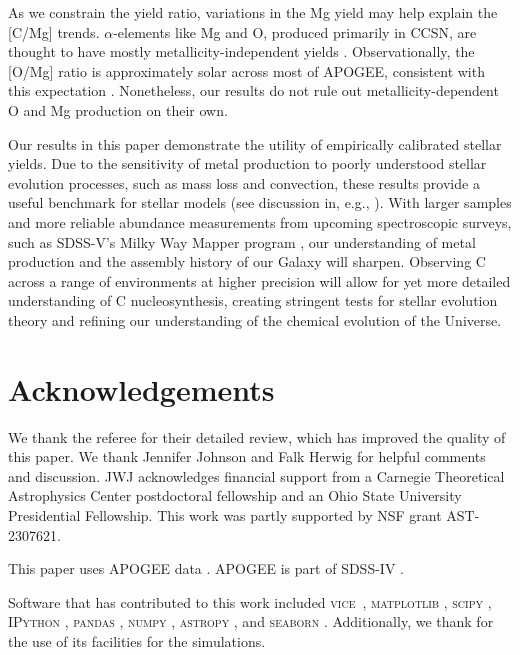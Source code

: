 \documentclass[fleqn,
usenatbib]{mnras}
\newcommand{\VICE}{\textsc{vice}}
\begin{document}
As we constrain the yield ratio, variations in the Mg yield may help explain the [C/Mg] trends. $\alpha$-elements like Mg and O, produced primarily in CCSN, are thought to have mostly metallicity-independent yields \citep{andrews+17}. Observationally, the [O/Mg] ratio is approximately solar across most of APOGEE, consistent with this expectation  \citep[][]{weinberg+19}. Nonetheless, our results do not rule out metallicity-dependent O and Mg production on their own.


Our results in this paper demonstrate the utility of empirically calibrated stellar yields. Due to the sensitivity of metal production to poorly understood stellar evolution processes, such as mass loss and convection, these results provide a useful benchmark for stellar models (see discussion in, e.g., \citealt{gil-pons+2022}). With larger samples and more reliable abundance measurements from upcoming spectroscopic surveys, such as SDSS-V's Milky Way Mapper program \citep{kollmeier+25}, our understanding of metal production and the assembly history of our Galaxy will sharpen.
Observing C across a range of environments at higher precision will allow for yet more detailed understanding of C nucleosynthesis, creating stringent tests for stellar evolution theory and refining our understanding of the chemical evolution of the Universe. 


 
\section*{Acknowledgements}

We thank the referee for their detailed review, which has improved the quality of this paper.
We thank Jennifer Johnson and Falk Herwig for helpful comments and discussion. JWJ acknowledges financial support from a Carnegie Theoretical Astrophysics Center postdoctoral fellowship and an Ohio State University Presidential Fellowship. This work was partly supported by NSF grant AST-2307621.

This paper uses APOGEE data \citep{apogee_instrumentation, apogee17, aspcap}. APOGEE is  part of SDSS-IV \citep{sloan_telescope, sdss_iv_overview, sdss17}.

Software that has contributed to this work included  
\VICE~\citep{JW20, james+21},
\textsc{matplotlib} \citep{matplotlib},
\textsc{scipy} \citep{scipy},
\textsc{IPython} \citep{ipy},
\textsc{pandas} \citep{pandas},
\textsc{numpy} \citep{numpy},
\textsc{astropy} \citep{astropy:2013, astropy:2018, astropy:2022},
and 
\textsc{seaborn} \citep{seaborn}
.
Additionally, we thank \citet{OhioSupercomputerCenter1987} for the use of its facilities for the simulations. 
\end{document}
